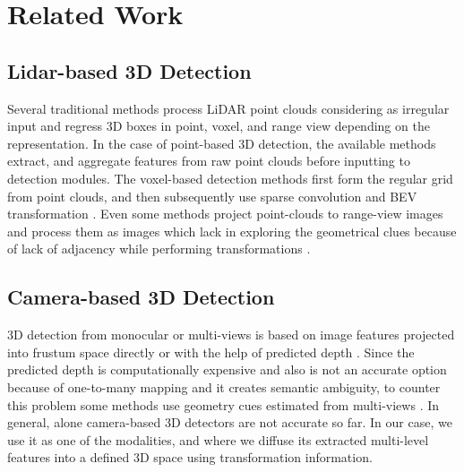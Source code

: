 \documentclass[10pt,twocolumn,letterpaper]{article}
\begin{document}
\section{Related Work}
\label{sec:related_work}
\subsection{Lidar-based 3D Detection}
Several traditional methods process LiDAR point clouds considering as irregular input and regress 3D boxes in point, voxel, and range view depending on the representation. In the case of point-based 3D detection, the available methods extract, and aggregate features from raw point clouds \cite{yang2019std, shi2019pointrcnn, qi2019deep} before inputting to detection modules. The voxel-based detection methods first form the regular grid from point clouds, and then subsequently use sparse convolution and BEV transformation \cite{graham2017submanifold,chen2022focal,yang2018pixor,yang2018hdnet,lang2019pointpillars,yan2018second,deng2021voxel,yin2021center}. Even some methods project point-clouds to range-view images and process them as images which lack in exploring the geometrical clues because of lack of adjacency while performing transformations \cite{li2016vehicle,fan2021rangedet}. %

\subsection{Camera-based 3D Detection}
3D detection from monocular or multi-views is based on image features projected into frustum space directly or with the help of predicted depth \cite{brazil2019m3d, simonelli2019disentangling, wang2021fcos3d, huang2021bevdet, chen2020dsgn }. Since the predicted depth is computationally expensive and also is not an accurate option because of one-to-many mapping and it creates semantic ambiguity, to counter this problem some methods use geometry cues estimated from multi-views \cite{wang2022detr3d, liu2022petr}. In general, alone camera-based 3D detectors are not accurate so far. In our case, we use it as one of the modalities, and where we diffuse its extracted multi-level features into a defined 3D space using transformation information. 
\end{document}
